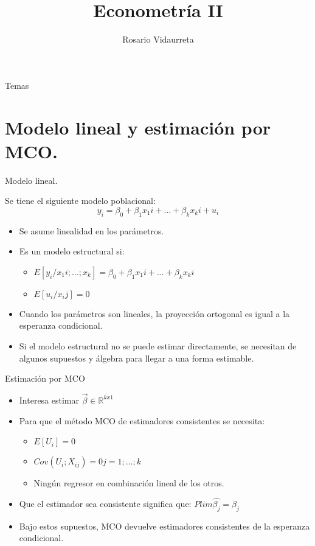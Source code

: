 \documentclass{beamer}
\title{Econometr\'ia II}
\author{Rosario Vidaurreta}
\institute{Facultad de Ciencias Econ\'omicas, UBA.}
\date{ }
\begin{document}
\begin{frame}
  \titlepage
\end{frame}


\begin{frame}{Temas}
  \tableofcontents
\end{frame}

\section{Modelo lineal y estimaci\'on por MCO.}

\begin{frame}{Modelo lineal.}

Se tiene el siguiente modelo poblacional:
\begin{equation}
    y_i = \beta_0 + \beta_1 x_1i  +...+ \beta_k x_ki + u_i
\end{equation}

\begin{itemize}
  \item Se asume linealidad en los par\'ametros.
  \item Es un modelo estructural si:
  \begin{itemize}
      \item $ E[y_i/x_1i;...;x_k]=\beta_0 + \beta_1x_1i+...+\beta_k x_ki $
      \item $E[u_i/x_ij]=0$
 \end{itemize}
 \item Cuando los parámetros son lineales, la proyecci\'on ortogonal es igual a la esperanza condicional.
 \item Si el modelo estructural no se puede estimar directamente, se necesitan de algunos supuestos y \'algebra para llegar a una forma estimable.
\end{itemize}

\end{frame}

\begin{frame}{Estimaci\'on por MCO}
\begin{itemize}
    \item Interesa estimar $ \Vec{\beta} \in \mathbb{R}^{kx1}$
    \item Para que el método MCO de estimadores consistentes se necesita:
    \begin{itemize}
        \item $E[U_i]=0$
        \item $Cov(U_i ; X_{ij})=0  j=1;\dotsc;k$
        \item Ningún regresor en combinaci\'on lineal de los otros.
    \end{itemize}
   \item Que el estimador sea consistente significa que:
   $Plim \hat{\beta_j}=\beta_j$
   \item Bajo estos supuestos, MCO devuelve estimadores consistentes de la esperanza condicional.
\end{itemize}

\end{frame}
\end{document}
